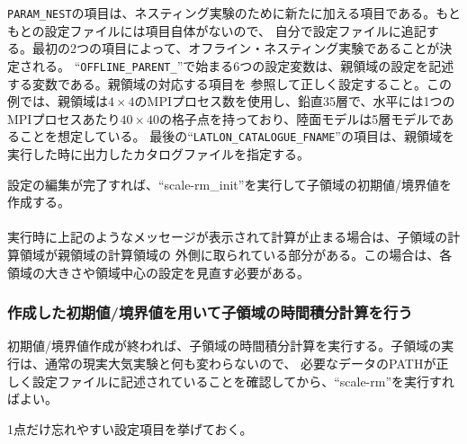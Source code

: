 \verb|PARAM_NEST|の項目は、ネスティング実験のために新たに加える項目である。もともとの設定ファイルには項目自体がないので、
自分で設定ファイルに追記する。最初の2つの項目によって、オフライン・ネスティング実験であることが決定される。
``\verb|OFFLINE_PARENT_|''で始まる6つの設定変数は、親領域の設定を記述する変数である。親領域の対応する項目を
参照して正しく設定すること。この例では、親領域は$4 \times 4$のMPIプロセス数を使用し、鉛直35層で、水平には1つの
MPIプロセスあたり$40 \times 40$の格子点を持っており、陸面モデルは5層モデルであることを想定している。
最後の``\verb|LATLON_CATALOGUE_FNAME|''の項目は、親領域を実行した時に出力したカタログファイルを指定する。

設定の編集が完了すれば、``scale-rm\_init''を実行して子領域の初期値/境界値を作成する。\\

\\

\noindent 実行時に上記のようなメッセージが表示されて計算が止まる場合は、子領域の計算領域が親領域の計算領域の
外側に取られている部分がある。この場合は、各領域の大きさや領域中心の設定を見直す必要がある。


\subsubsection{作成した初期値/境界値を用いて子領域の時間積分計算を行う}
初期値/境界値作成が終われば、子領域の時間積分計算を実行する。子領域の実行は、通常の現実大気実験と何も変わらないので、
必要なデータのPATHが正しく設定ファイルに記述されていることを確認してから、``scale-rm''を実行すればよい。

1点だけ忘れやすい設定項目を挙げておく。\\

\\

